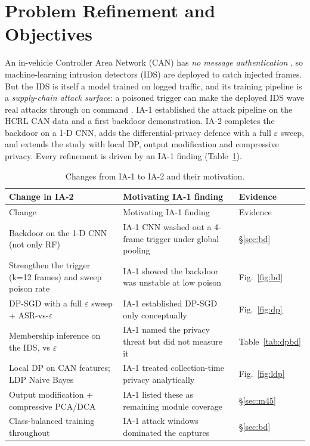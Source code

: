 \documentclass[11pt,a4paper]{article}
\begin{document}
\section{Problem Refinement and Objectives}\label{sec:refine}
An in-vehicle Controller Area Network (CAN) has \emph{no message authentication}
\citep{koscher2010experimental}, so machine-learning intrusion detectors (IDS)
are deployed to catch injected frames. But the IDS is itself a model trained on
logged traffic, and its training pipeline is a \emph{supply-chain attack surface}:
a poisoned trigger can make the deployed IDS wave real attacks through on command
\citep{gu2017badnets}. IA-1 established the attack pipeline on the HCRL CAN data
and a first backdoor demonstration. IA-2 completes the backdoor on a 1-D CNN,
adds the differential-privacy defence with a full $\varepsilon$ sweep, and extends
the study with local DP, output modification and compressive privacy. Every
refinement is driven by an IA-1 finding (Table~\ref{tab:changes}).

\begin{longtable}{p{5.1cm}p{5.0cm}p{3.7cm}}
\caption{Changes from IA-1 to IA-2 and their motivation.}\label{tab:changes}\\
\toprule Change in IA-2 & Motivating IA-1 finding & Evidence\\ \midrule\endfirsthead
\toprule Change & Motivating IA-1 finding & Evidence\\ \midrule\endhead
Backdoor on the 1-D CNN (not only RF) & IA-1 CNN washed out a 4-frame trigger under global pooling & \S\ref{sec:bd}\\
Strengthen the trigger (k=12 frames) and sweep poison rate & IA-1 showed the backdoor was unstable at low poison & Fig.~\ref{fig:bd}\\
DP-SGD with a full $\varepsilon$ sweep + ASR-vs-$\varepsilon$ & IA-1 established DP-SGD only conceptually & Fig.~\ref{fig:dp}\\
Membership inference on the IDS, vs $\varepsilon$ & IA-1 named the privacy threat but did not measure it & Table~\ref{tab:dpbd}\\
Local DP on CAN features; LDP Naive Bayes & IA-1 treated collection-time privacy analytically & Fig.~\ref{fig:ldp}\\
Output modification + compressive PCA/DCA & IA-1 listed these as remaining module coverage & \S\ref{sec:m45}\\
Class-balanced training throughout & IA-1 attack windows dominated the captures & \S\ref{sec:bd}\\
\bottomrule\end{longtable}
\end{document}
